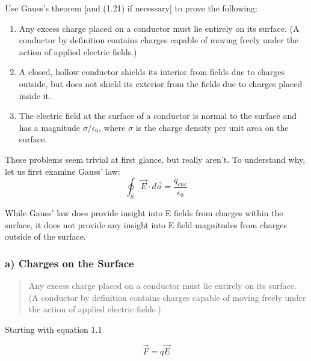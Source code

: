 \begin{question}
Use Gauss's theorem [and (1.21) if necessary] to prove the following:

  \begin{enumerate}[label=\alph*]

    \item Any excess charge placed on a conductor must lie entirely on
      its surface. (A conductor by definition contains charges capable
      of moving freely under the action of applied electric fields.)

    \item A closed, hollow conductor shields its interior from fields
      due to charges outside, but does not shield its exterior from
      the fields due to charges placed inside it.

    \item The electric field at the surface of a conductor is normal
      to the surface and has a magnitude $\sigma / \epsilon_0$, where
      $\sigma$ is the charge density per unit area on the surface.

  \end{enumerate}

\end{question}

These problems seem trivial at first glance, but really aren't.  To
understand why, let us first examine Gauss' law:
\begin{equation}
  \oint_S \vec{E} \cdot d\vec{a} = \frac{q_{enc}}{\epsilon_0}
\end{equation}

While Gauss' law does provide insight into E fields from charges
within the surface, it does not provide any insight into E field
magnitudes from charges outside of the surface.

\subsubsection*{a) Charges on the Surface}

\begin{quote}
Any excess charge placed on a conductor must lie entirely on its
surface. (A conductor by definition contains charges capable of moving
freely under the action of applied electric fields.)
\end{quote}

Starting with equation 1.1

\begin{equation}
\vec{F} = q\vec{E}
\end{equation}

